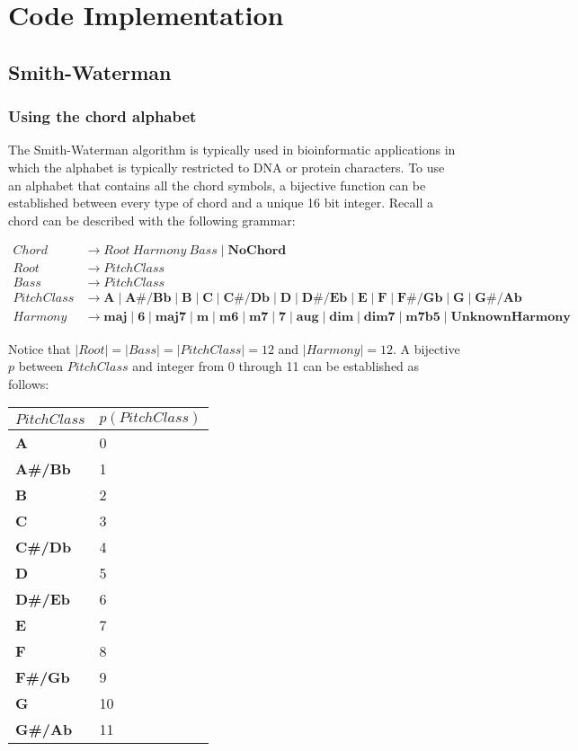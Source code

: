 \chapter{Code Implementation}

\section{Smith-Waterman}

\subsection{Using the chord alphabet}

The Smith-Waterman algorithm is typically used in bioinformatic applications in which the alphabet is typically restricted to DNA or protein characters. To use an alphabet that contains all the chord symbols, a bijective function can be established between every type of chord and a unique 16 bit integer. Recall a chord can be described with the following grammar:

\begin{align*}
Chord &\to Root\ Harmony \ Bass \mid \textbf{NoChord} \\
Root &\to PitchClass \\
Bass &\to PitchClass \\
PitchClass &\to \textbf{A} \mid \textbf{A#/Bb} \mid \textbf{B} \mid \textbf{C} \mid \textbf{C#/Db} \mid \textbf{D} \mid \textbf{D#/Eb} \mid \textbf{E} \mid \textbf{F} \mid \textbf{F#/Gb} \mid \textbf{G} \mid \textbf{G#/Ab} \\
Harmony &\to \textbf{maj} \mid \textbf{6} \mid \textbf{maj7} \mid \textbf{m} \mid \textbf{m6} \mid \textbf{m7} \mid \textbf{7} \mid \textbf{aug} \mid \textbf{dim} \mid \textbf{dim7} \mid \textbf{m7b5} \mid \textbf{UnknownHarmony}
\end{align*}

Notice that $|Root| = |Bass| = |PitchClass| = 12$ and $|Harmony| = 12$. A bijective $p$ between $PitchClass$ and integer from 0 through 11 can be established as follows:

\begin{tabular}{ll}
\toprule
$PitchClass$ & $p(PitchClass)$ \\
\midrule
\textbf{A} & 0 \\
\textbf{A#/Bb} & 1 \\
\textbf{B} & 2 \\
\textbf{C} & 3 \\
\textbf{C#/Db} & 4 \\
\textbf{D} & 5 \\
\textbf{D#/Eb} & 6 \\
\textbf{E} & 7 \\
\textbf{F} & 8 \\
\textbf{F#/Gb} & 9 \\
\textbf{G} & 10 \\
\textbf{G#/Ab} & 11 \\
\bottomrule
\end{tabular}


